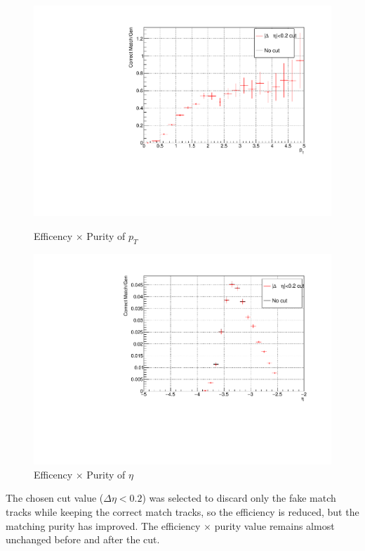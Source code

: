 \begin{figure}[htbp]
                    \\
                    \vspace{1em}
                    \begin{minipage}{0.45\textwidth}
                            \centering
                            \includegraphics[width=\textwidth]{fig/3_5_6_effpuri_pt.pdf}
                        \caption{Efficency $\times$ Purity of $p_T$}
                    \end{minipage}
                    \hfill
                    \begin{minipage}{0.45\textwidth}
                        \centering
                        \includegraphics[width=\textwidth]{fig/3_5_6_effpuri_eta.pdf}
                        \caption{Efficency $\times$ Purity of $\eta$}
                    \end{minipage}
                \end{figure}
        
                The chosen cut value ($\Delta \eta < 0.2$) was selected to discard only the fake match tracks while keeping the correct match tracks, so the efficiency is reduced, but the matching purity has improved. The efficiency $\times$ purity value remains almost unchanged before and after the cut.